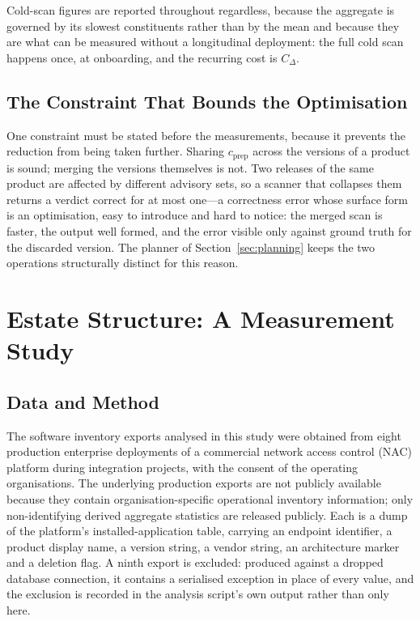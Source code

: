 \documentclass[fleqn,10pt,lineno]{wlpeerj}
\begin{document}
Cold-scan figures are reported throughout regardless, because the aggregate is governed by its slowest constituents rather than by the mean \cite{dean2013} and because they are what can be measured without a longitudinal deployment: the full cold scan happens once, at onboarding, and the recurring cost is $C_\Delta$.

\subsection{The Constraint That Bounds the Optimisation}
One constraint must be stated before the measurements, because it prevents the reduction from being taken further. Sharing $c_{\text{prep}}$ across the versions of a product is sound; merging the versions themselves is not. Two releases of the same product are affected by different advisory sets, so a scanner that collapses them returns a verdict correct for at most one---a correctness error whose surface form is an optimisation, easy to introduce and hard to notice: the merged scan is faster, the output well formed, and the error visible only against ground truth for the discarded version. The planner of Section~\ref{sec:planning} keeps the two operations structurally distinct for this reason.

\section{Estate Structure: A Measurement Study}
\label{sec:estate}

\subsection{Data and Method}
The software inventory exports analysed in this study were obtained from eight production enterprise deployments of a commercial network access control (NAC) platform during integration projects, with the consent of the operating organisations. The underlying production exports are not publicly available because they contain organisation-specific operational inventory information; only non-identifying derived aggregate statistics are released publicly. Each is a dump of the platform's installed-application table, carrying an endpoint identifier, a product display name, a version string, a vendor string, an architecture marker and a deletion flag. A ninth export is excluded: produced against a dropped database connection, it contains a serialised exception in place of every value, and the exclusion is recorded in the analysis script's own output rather than only here.
\end{document}
